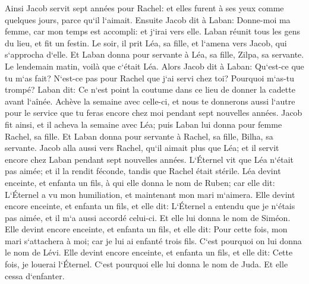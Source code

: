 \verse Ainsi Jacob servit sept années pour Rachel: et elles furent à ses yeux comme quelques jours, parce qu`il l`aimait. 
\verse Ensuite Jacob dit à Laban: Donne-moi ma femme, car mon temps est accompli: et j`irai vers elle. 
\verse Laban réunit tous les gens du lieu, et fit un festin. 
\verse Le soir, il prit Léa, sa fille, et l`amena vers Jacob, qui s`approcha d`elle. 
\verse Et Laban donna pour servante à Léa, sa fille, Zilpa, sa servante. 
\verse Le lendemain matin, voilà que c`était Léa. Alors Jacob dit à Laban: Qu`est-ce que tu m`as fait? N`est-ce pas pour Rachel que j`ai servi chez toi? Pourquoi m`as-tu trompé? 
\verse Laban dit: Ce n`est point la coutume dans ce lieu de donner la cadette avant l`aînée. 
\verse Achève la semaine avec celle-ci, et nous te donnerons aussi l`autre pour le service que tu feras encore chez moi pendant sept nouvelles années. 
\verse Jacob fit ainsi, et il acheva la semaine avec Léa; puis Laban lui donna pour femme Rachel, sa fille. 
\verse Et Laban donna pour servante à Rachel, sa fille, Bilha, sa servante. 
\verse Jacob alla aussi vers Rachel, qu`il aimait plus que Léa; et il servit encore chez Laban pendant sept nouvelles années. 
\verse L`Éternel vit que Léa n`était pas aimée; et il la rendit féconde, tandis que Rachel était stérile. 
\verse Léa devint enceinte, et enfanta un fils, à qui elle donna le nom de Ruben; car elle dit: L`Éternel a vu mon humiliation, et maintenant mon mari m`aimera. 
\verse Elle devint encore enceinte, et enfanta un fils, et elle dit: L`Éternel a entendu que je n`étais pas aimée, et il m`a aussi accordé celui-ci. Et elle lui donna le nom de Siméon. 
\verse Elle devint encore enceinte, et enfanta un fils, et elle dit: Pour cette fois, mon mari s`attachera à moi; car je lui ai enfanté trois fils. C`est pourquoi on lui donna le nom de Lévi. 
\verse Elle devint encore enceinte, et enfanta un fils, et elle dit: Cette fois, je louerai l`Éternel. C`est pourquoi elle lui donna le nom de Juda. Et elle cessa d`enfanter. 

